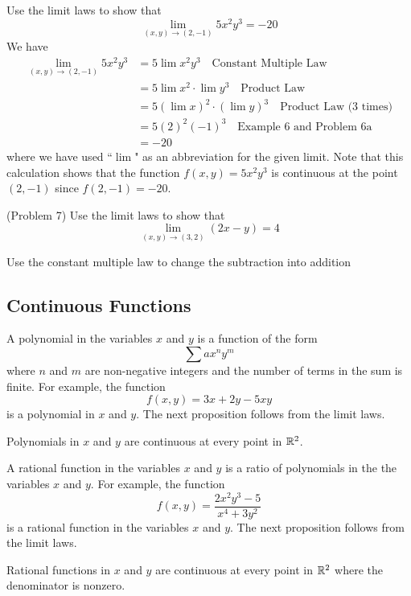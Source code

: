\documentclass[handout]{ximera}
\begin{document}
\begin{example}[Example 7]
Use the limit laws to show that 
\[
\lim_{(x,y) \to (2,-1)} 5x^2y^3 = -20
\]
We have
\begin{align*}
\lim_{(x,y) \to (2,-1)} 5x^2y^3 &= 5\lim x^2y^3 \quad \text{Constant Multiple Law}\\
  &= 5 \lim x^2 \cdot \lim y^3  \quad \text{Product Law}\\
  &= 5 \left(\lim x\right)^2 \cdot \left(\lim y\right)^3  \quad \text{Product Law (3 times)}\\
  &= 5(2)^2(-1)^3 \quad \text{Example 6 and Problem 6a}\\
  &= -20
\end{align*}
where we have used ``$\lim$" as an abbreviation for the given limit.
Note that this calculation shows that the function $f(x,y) = 5x^2y^3$ is continuous at the point $(2, -1)$ since $f(2, -1) = -20$.
\end{example}


\begin{problem}(Problem 7)
Use the limit laws to show that 
\[
\lim_{(x,y) \to (3,2)} (2x - y) = 4
\]
\begin{hint}
Use the constant multiple law to change the subtraction into addition
\end{hint}
\end{problem}

\subsection{Continuous Functions}
A polynomial in the variables $x$ and $y$ is a function of the form
\[
\sum ax^ny^m
\]
where $n$ and $m$ are non-negative integers and the number of terms in the sum is finite.
For example, the function
\[
f(x,y) = 3x + 2y - 5xy
\]
is a polynomial in $x$ and $y$. The next proposition follows from the limit laws.

\begin{proposition}
Polynomials in $x$ and $y$ are continuous at every point in $\mathbb R^2$.
\end{proposition}

A rational function in the variables $x$ and $y$ is a ratio of polynomials in the the variables $x$ and $y$.
For example, the function
\[
f(x,y) = \frac{2x^2y^3 - 5}{x^4 + 3y^2}
\]
is a rational function in the variables $x$ and $y$.
The next proposition follows from the limit laws.

\begin{proposition}
Rational functions in $x$ and $y$ are continuous at every point in $\mathbb R^2$ where the denominator is nonzero.
\end{proposition}
\end{document}

